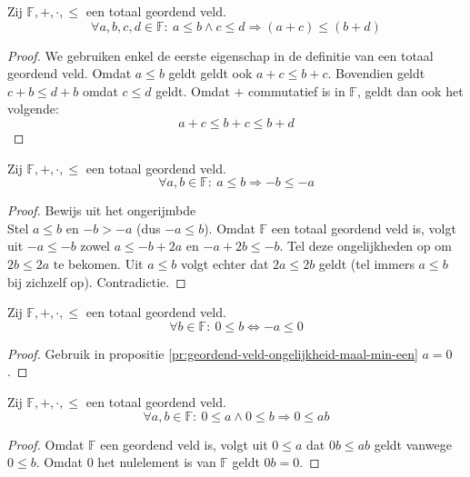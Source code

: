 \documentclass[main.tex]{subfiles}
\begin{document}
\begin{pr}
  \label{pr:geordend-veld-optelling-ongelijkheden}
  Zij $\mathbb{F},+,\cdot,\le$ een totaal geordend veld.
  \[ \forall a,b,c,d \in \mathbb{F}:\ a\le b \wedge c \le d \Rightarrow (a+c) \le (b+d) \]

  \begin{proof}
    We gebruiken enkel de eerste eigenschap in de definitie van een totaal geordend veld.
    Omdat $a\le b$ geldt geldt ook $a + c \le b+c$.
    Bovendien geldt $c+b \le d+b$ omdat $c\le d$ geldt.
    Omdat $+$ commutatief is in $\mathbb{F}$, geldt dan ook het volgende:
    \[ a+c \le b+c \le b+d\]
  \end{proof}
\end{pr}

\begin{pr}
  \label{pr:geordend-veld-ongelijkheid-maal-min-een}
  Zij $\mathbb{F},+,\cdot,\le$ een totaal geordend veld.
  \[ \forall a,b\in \mathbb{F}:\ a \le b \Rightarrow -b \le -a \]

  \begin{proof}
    Bewijs uit het ongerijmbde\\
    Stel $a \le b$ en $-b > -a$ (dus $-a \le b$).
    Omdat $\mathbb{F}$ een totaal geordend veld is, volgt uit $-a \le -b$ zowel $a \le -b+2a$ en $-a+2b \le -b$.
    Tel deze ongelijkheden op om $2b \le 2a$ te bekomen.
    Uit $a\le b$ volgt echter dat $2a \le 2b$ geldt (tel immers $a\le b$ bij zichzelf op).
    Contradictie.
  \end{proof}
\end{pr}

\begin{pr}
  \label{pr:geordend-veld-tegengestelde-wisselt-teken}
  Zij $\mathbb{F},+,\cdot,\le$ een totaal geordend veld.
  \[ \forall b \in \mathbb{F}:\ 0 \le b \Leftrightarrow -a \le 0 \]

  \begin{proof}
    Gebruik in propositie \ref{pr:geordend-veld-ongelijkheid-maal-min-een} $a=0$.
  \end{proof}
\end{pr}

\begin{pr}
  \label{pr:geordend-veld-ongelijkheid-vermenigvuldiging}
  Zij $\mathbb{F},+,\cdot,\le$ een totaal geordend veld.
  \[ \forall a,b \in \mathbb{F}:\ 0 \le a \wedge 0 \le b \Rightarrow 0 \le ab \]

  \begin{proof}
    Omdat $\mathbb{F}$ een geordend veld is, volgt uit $0\le a$ dat $0b \le ab$ geldt vanwege $0 \le b$.
    Omdat $0$ het nulelement is van $\mathbb{F}$ geldt $0b = 0$.
  \end{proof}
\end{pr}
\end{document}
